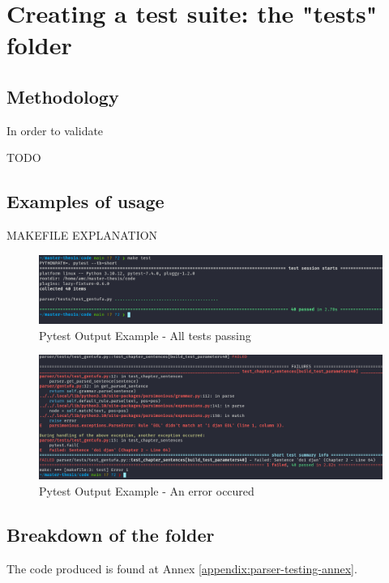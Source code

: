 \chapter{Creating a test suite: the "tests" folder}
\label{chap:creating_a_test_suite}

\section{Methodology}

In order to validate

TODO

\section{Examples of usage}

MAKEFILE EXPLANATION

\begin{figure}[H]
\hspace{-1.1cm}
\includegraphics[scale=0.43]{images/pytest_output_pass.png}
\caption{Pytest Output Example - All tests passing}
\end{figure}

\begin{figure}[H]
\hspace{-2.2cm}
\includegraphics[scale=0.43]{images/pytest_output_fail.png}
\caption{Pytest Output Example - An error occured}
\end{figure}

\section{Breakdown of the folder}

The code produced is found at Annex \ref{appendix:parser-testing-annex}.